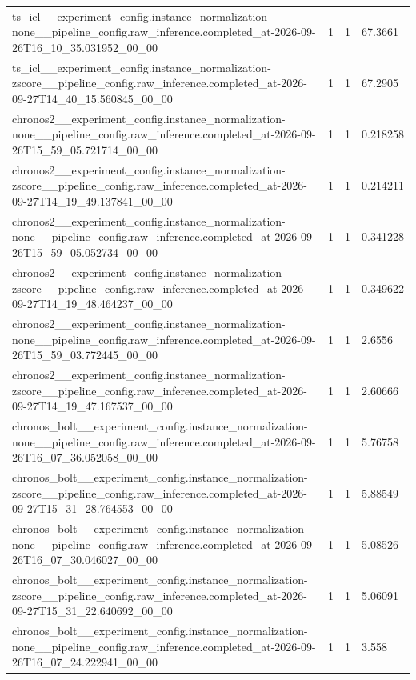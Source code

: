 \begin{tabular}{llll}
ts\_icl\_\_experiment\_config.instance\_normalization-none\_\_pipeline\_config.raw\_inference.completed\_at-2026-09-26T16\_10\_35.031952\_00\_00 & 1 & 1 & 67.3661 \\
ts\_icl\_\_experiment\_config.instance\_normalization-zscore\_\_pipeline\_config.raw\_inference.completed\_at-2026-09-27T14\_40\_15.560845\_00\_00 & 1 & 1 & 67.2905 \\
chronos2\_\_experiment\_config.instance\_normalization-none\_\_pipeline\_config.raw\_inference.completed\_at-2026-09-26T15\_59\_05.721714\_00\_00 & 1 & 1 & 0.218258 \\
chronos2\_\_experiment\_config.instance\_normalization-zscore\_\_pipeline\_config.raw\_inference.completed\_at-2026-09-27T14\_19\_49.137841\_00\_00 & 1 & 1 & 0.214211 \\
chronos2\_\_experiment\_config.instance\_normalization-none\_\_pipeline\_config.raw\_inference.completed\_at-2026-09-26T15\_59\_05.052734\_00\_00 & 1 & 1 & 0.341228 \\
chronos2\_\_experiment\_config.instance\_normalization-zscore\_\_pipeline\_config.raw\_inference.completed\_at-2026-09-27T14\_19\_48.464237\_00\_00 & 1 & 1 & 0.349622 \\
chronos2\_\_experiment\_config.instance\_normalization-none\_\_pipeline\_config.raw\_inference.completed\_at-2026-09-26T15\_59\_03.772445\_00\_00 & 1 & 1 & 2.6556 \\
chronos2\_\_experiment\_config.instance\_normalization-zscore\_\_pipeline\_config.raw\_inference.completed\_at-2026-09-27T14\_19\_47.167537\_00\_00 & 1 & 1 & 2.60666 \\
chronos\_bolt\_\_experiment\_config.instance\_normalization-none\_\_pipeline\_config.raw\_inference.completed\_at-2026-09-26T16\_07\_36.052058\_00\_00 & 1 & 1 & 5.76758 \\
chronos\_bolt\_\_experiment\_config.instance\_normalization-zscore\_\_pipeline\_config.raw\_inference.completed\_at-2026-09-27T15\_31\_28.764553\_00\_00 & 1 & 1 & 5.88549 \\
chronos\_bolt\_\_experiment\_config.instance\_normalization-none\_\_pipeline\_config.raw\_inference.completed\_at-2026-09-26T16\_07\_30.046027\_00\_00 & 1 & 1 & 5.08526 \\
chronos\_bolt\_\_experiment\_config.instance\_normalization-zscore\_\_pipeline\_config.raw\_inference.completed\_at-2026-09-27T15\_31\_22.640692\_00\_00 & 1 & 1 & 5.06091 \\
chronos\_bolt\_\_experiment\_config.instance\_normalization-none\_\_pipeline\_config.raw\_inference.completed\_at-2026-09-26T16\_07\_24.222941\_00\_00 & 1 & 1 & 3.558 \\

\end{tabular}
